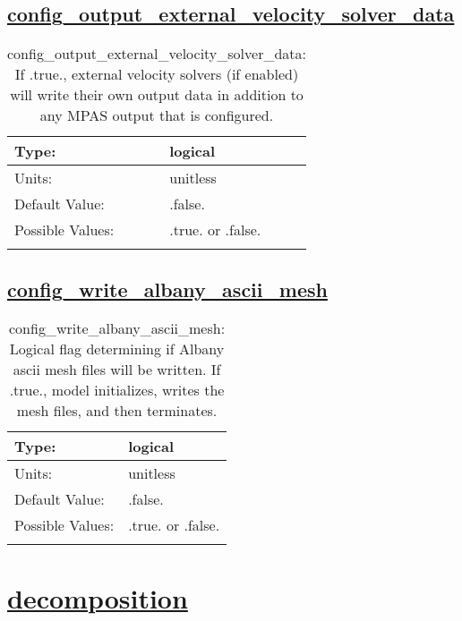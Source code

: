 \subsection[config\_output\_external\_velocity\_solver\_data]{\hyperref[sec:nm_tab_io]{config\_output\_external\_velocity\_solver\_data}}
\label{subsec:nm_sec_config_output_external_velocity_solver_data}
\begin{center}
\begin{longtable}{| p{2.0in} || p{4.0in} |}
    \hline
    Type: & logical \\
    \hline
    Units: & \si{unitless} \\
    \hline
    Default Value: & .false. \\
    \hline
    Possible Values: & .true. or .false. \\
    \hline
    \caption{config\_output\_external\_velocity\_solver\_data: If .true., external velocity solvers (if enabled) will write their own output data in addition to any MPAS output that is configured.}
\end{longtable}
\end{center}
\subsection[config\_write\_albany\_ascii\_mesh]{\hyperref[sec:nm_tab_io]{config\_write\_albany\_ascii\_mesh}}
\label{subsec:nm_sec_config_write_albany_ascii_mesh}
\begin{center}
\begin{longtable}{| p{2.0in} || p{4.0in} |}
    \hline
    Type: & logical \\
    \hline
    Units: & \si{unitless} \\
    \hline
    Default Value: & .false. \\
    \hline
    Possible Values: & .true. or .false. \\
    \hline
    \caption{config\_write\_albany\_ascii\_mesh: Logical flag determining if Albany ascii mesh files will be written.  If .true., model initializes, writes the mesh files, and then terminates.}
\end{longtable}
\end{center}
\section[decomposition]{\hyperref[sec:nm_tab_decomposition]{decomposition}}
\label{sec:nm_sec_decomposition}
